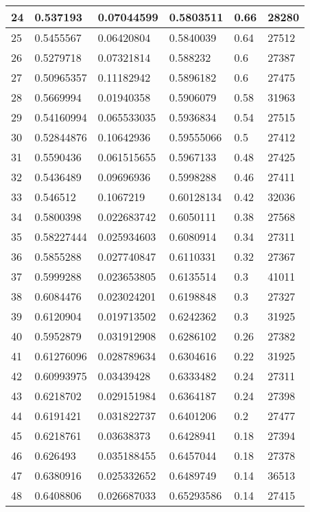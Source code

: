 \begin{longtable}{|l|l|l|l|l|l|}
24 & 0.537193 & 0.07044599 & 0.5803511 & 0.66 & 28280 \\ \hline 
25 & 0.5455567 & 0.06420804 & 0.5840039 & 0.64 & 27512 \\ \hline 
26 & 0.5279718 & 0.07321814 & 0.588232 & 0.6 & 27387 \\ \hline 
27 & 0.50965357 & 0.11182942 & 0.5896182 & 0.6 & 27475 \\ \hline 
28 & 0.5669994 & 0.01940358 & 0.5906079 & 0.58 & 31963 \\ \hline 
29 & 0.54160994 & 0.065533035 & 0.5936834 & 0.54 & 27515 \\ \hline 
30 & 0.52844876 & 0.10642936 & 0.59555066 & 0.5 & 27412 \\ \hline 
31 & 0.5590436 & 0.061515655 & 0.5967133 & 0.48 & 27425 \\ \hline 
32 & 0.5436489 & 0.09696936 & 0.5998288 & 0.46 & 27411 \\ \hline 
33 & 0.546512 & 0.1067219 & 0.60128134 & 0.42 & 32036 \\ \hline 
34 & 0.5800398 & 0.022683742 & 0.6050111 & 0.38 & 27568 \\ \hline 
35 & 0.58227444 & 0.025934603 & 0.6080914 & 0.34 & 27311 \\ \hline 
36 & 0.5855288 & 0.027740847 & 0.6110331 & 0.32 & 27367 \\ \hline 
37 & 0.5999288 & 0.023653805 & 0.6135514 & 0.3 & 41011 \\ \hline 
38 & 0.6084476 & 0.023024201 & 0.6198848 & 0.3 & 27327 \\ \hline 
39 & 0.6120904 & 0.019713502 & 0.6242362 & 0.3 & 31925 \\ \hline 
40 & 0.5952879 & 0.031912908 & 0.6286102 & 0.26 & 27382 \\ \hline 
41 & 0.61276096 & 0.028789634 & 0.6304616 & 0.22 & 31925 \\ \hline 
42 & 0.60993975 & 0.03439428 & 0.6333482 & 0.24 & 27311 \\ \hline 
43 & 0.6218702 & 0.029151984 & 0.6364187 & 0.24 & 27398 \\ \hline 
44 & 0.6191421 & 0.031822737 & 0.6401206 & 0.2 & 27477 \\ \hline 
45 & 0.6218761 & 0.03638373 & 0.6428941 & 0.18 & 27394 \\ \hline 
46 & 0.626493 & 0.035188455 & 0.6457044 & 0.18 & 27378 \\ \hline 
47 & 0.6380916 & 0.025332652 & 0.6489749 & 0.14 & 36513 \\ \hline 
48 & 0.6408806 & 0.026687033 & 0.65293586 & 0.14 & 27415 \\ \hline 

\end{longtable}
